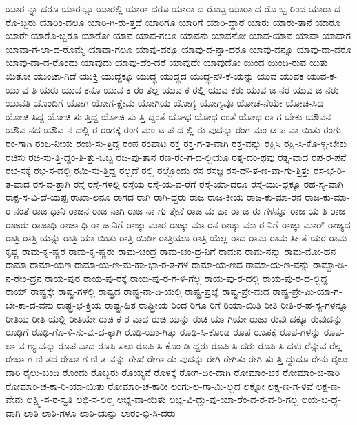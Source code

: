 {ಯಾರ-ನ್ನಾ-ದರೂ
ಯಾರನ್ನೂ
ಯಾರಲ್ಲಿ
ಯಾರಾ-ದರೂ
ಯಾರಾ-ದ-ರೊಬ್ಬ
ಯಾರಾ-ದ-ರೊ-ಬ್ಬ-ರಿಂದ
ಯಾರಾ-ದ-ರೊ-ಬ್ಬರು
ಯಾರಿಂ-ದಲೂ
ಯಾರಿ-ಗಿ-ರು-ತ್ತದೆ
ಯಾರಿಗೂ
ಯಾರಿಗೆ
ಯಾರಿ-ದ್ದಾರೆ
ಯಾರು
ಯಾರು-ತಾನೆ
ಯಾರೂ
ಯಾರೇ
ಯಾರೊ-ಬ್ಬರೂ
ಯಾರೋ
ಯಾವ
ಯಾವ-ಗಲೂ
ಯಾವನು
ಯಾವನೋ
ಯಾವ-ಯಾವ
ಯಾವಾ
ಯಾವಾಗ
ಯಾವಾ-ಗ-ಲಾ-ದ-ರೊಮ್ಮೆ
ಯಾವಾ-ಗಲೂ
ಯಾವು-ದಕ್ಕೂ
ಯಾವು-ದ-ನ್ನಾ-ದರೂ
ಯಾವು-ದನ್ನೂ
ಯಾವು-ದಾ-ದರೂ
ಯಾವು-ದಾ-ದ-ರೊಂದು
ಯಾವುದು
ಯಾವು-ದೆಂ-ದರೆ
ಯಾವುದೇ
ಯಾವುದೋ
ಯಿಂದ
ಯಿಂದಿ-ರುವ
ಯಿತು
ಯಿತೋ
ಯುಂಟಾ-ಗಿದೆ
ಯುಕ್ತಿ
ಯುದ್ದಕ್ಕೂ
ಯುದ್ಧ
ಯುದ್ಧದ
ಯುದ್ಧ-ನೌ-ಕೆ-ಯನ್ನು
ಯುವ
ಯುವಕ
ಯುವ-ಕ-ಯು-ವ-ತಿ-ಯರು
ಯುವ-ಕನೂ
ಯುವ-ಕ-ರಂ-ತಲ್ಲ
ಯುವ-ಕ-ರಲ್ಲಿ
ಯುವ-ಕರು
ಯುವ-ಜ-ನರ
ಯುವ-ಜ-ನರು
ಯುವತಿ
ಯೊಂದಿಗೆ
ಯೋಗ
ಯೋಗ-ಕ್ಷೇಮ
ಯೋಗಿಯ
ಯೋಗ್ಯ
ಯೋಗ್ಯವೂ
ಯೋಚ-ನೆಯೇ
ಯೋಚಿ-ಸಿದ
ಯೋಚಿ-ಸಿದ್ದ
ಯೋಚಿ-ಸು-ತ್ತಿದ್ದ
ಯೋಚಿ-ಸು-ತ್ತಿ-ದ್ದಂತೆ
ಯೋಧ
ಯೋಧ-ರಂತೆ
ಯೋಧ-ರಾ-ಗ-ಬೇಕು
ಯೌವನ
ಯೌವ-ನದ
ಯೌವ-ನ-ದಲ್ಲಿ
ರ
ರಂಗಕ್ಕೆ
ರಂಗ-ಮಂ-ಟ-ಪ-ದ-ಲ್ಲಿ-ರು-ವುದನ್ನು
ರಂಗ-ಮಂ-ಟ-ಪ-ವಾ-ಯಿತು
ರಂಗು-ರಂ-ಗಾಗಿ
ರಂಜ-ನೀಯ
ರಂಜಿ-ಸು-ತ್ತಿದ್ದ
ರಂಪ
ರಂಪಾಟ
ರಕ್ತ
ರಕ್ತ-ಗ-ತ-ವಾಗಿ
ರಕ್ತ-ವನ್ನು
ರಕ್ಷಿಸಿ
ರಕ್ಷಿ-ಸಿ-ಕೊ-ಳ್ಳ-ಬೇಕು
ರಚಿಸು
ರಚಿ-ಸು-ತ್ತಿ-ದ್ದಂ-ತಿ-ತ್ತು-ಒಬ್ಬ
ರಜ-ಪು-ತಾನ
ರಣ-ರಂ-ಗ-ದ-ಲ್ಲಿಯೂ
ರತ್ನ-ದಂ-ಥವು
ರತ್ನ-ವಾದ
ರಪ-ರ-ಪನೆ
ರಭ-ಸಕ್ಕೆ
ರಭ-ಸ-ದಲ್ಲಿ
ರಮಿ-ಸು-ತ್ತಿದ್ದ
ರಲ್ಲದೆ
ರಲ್ಲಿ
ರಲ್ಲೊಂದು
ರಸ
ರಸಜ್ಞ
ರಸ-ದೌ-ತ-ಣ-ವಾ-ಗು-ತ್ತಿತ್ತು
ರಸ-ಭ-ರಿ-ತ-ವಾದ
ರಸ-ವ-ತ್ತಾಗಿ
ರಸ್ತೆ
ರಸ್ತೆ-ಗಳಲ್ಲಿ
ರಸ್ತೆಯ
ರಸ್ತೆ-ಯ-ವ-ರೆಗೆ
ರಸ್ತೆ-ಯಾ-ದರೂ
ರಸ್ತೆ-ಯು-ದ್ದಕ್ಕೂ
ರಹ-ಸ್ಯ-ವಾಗಿ
ರಾಕ್ಷ-ಸ-ವಿ-ದೆ-ಯಪ್ಪ
ರಾಖಾ-ಲನೂ
ರಾಗದ
ರಾಗಿ
ರಾಗಿ-ದ್ದರು
ರಾಜ
ರಾಜ-ಕೀಯ
ರಾಜ-ಕು-ಮಾ-ರನ
ರಾಜ-ಕು-ಮಾ-ರ-ನಂತೆ
ರಾಜ-ಧಾನಿ
ರಾಜನ
ರಾಜ-ನಾಗಿ
ರಾಜ-ನಾ-ಗು-ತ್ತೇನೆ
ರಾಜ-ಮ-ಹಾ-ರಾ-ಜ-ರು-ಗಳನ್ನೂ
ರಾಜ-ಯ-ತಿ-ರಾಜ
ರಾಜರು
ರಾಜಾಧಿ
ರಾಜಾ-ಧಿ-ರಾ-ಜ-ನಿಗೆ
ರಾಜ್ಕು-ಮಾರ
ರಾಜ್ಕು-ಮಾ-ರನ
ರಾಜ್ಕು-ಮಾ-ರ-ನಿಗೆ
ರಾಜ್ಕು-ಮಾರ್
ರಾಜ್ಯದ
ರಾತ್ರಿ
ರಾತ್ರಿ-ಯನ್ನು
ರಾತ್ರಿ-ಯಾ-ಯಿತು
ರಾತ್ರಿ-ಯಿಡೀ
ರಾತ್ರಿಯೂ
ರಾತ್ರಿ-ಯೆಲ್ಲ
ರಾದ
ರಾಮ
ರಾಮ-ಸೀ-ತೆ-ಯರ
ರಾಮ-ಕೃಷ್ಣ
ರಾಮ-ಕೃ-ಷ್ಣರ
ರಾಮ-ಕೃ-ಷ್ಣರು
ರಾಮ-ಚಂದ್ರ
ರಾಮ-ಚಂ-ದ್ರ-ನಿಗೆ
ರಾಮನ
ರಾಮ-ನನ್ನು
ರಾಮ-ಮೋ-ಹನ
ರಾಮಾ
ರಾಮಾ-ಯಣ
ರಾಮಾ-ಯ-ಣ-ಮ-ಹಾ-ಭಾ-ರ-ತ-ಗಳ
ರಾಮಾ-ಯ-ಣದ
ರಾಮಾ-ಯ-ಣ-ವನ್ನು
ರಾಮ್ಖಾ-ಡಿ-ನ-ರೇಂ-ದ್ರನ
ರಾಯ-ಪುರ
ರಾಯ-ಪು-ರಕ್ಕೆ
ರಾಯ-ಪು-ರ-ಗ-ಳಿ-ಗೆಲ್ಲ
ರಾಯ-ಪು-ರ-ದಲ್ಲಿ
ರಾಯ-ಪು-ರ-ದ-ಲ್ಲಿದ್ದ
ರಾಯ್
ರಾಷ್ಟ್ರಕ್ಕೇ
ರಾಷ್ಟ್ರ-ಗಳಲ್ಲಿ
ರಾಷ್ಟ್ರದ
ರಾಷ್ಟ್ರ-ನಾ-ಡಿ-ಯಲ್ಲಿ
ರಾಷ್ಟ್ರ-ಪ್ರಜ್ಞೆ
ರಾಷ್ಟ್ರ-ಪ್ರೇ-ಮದ
ರಾಷ್ಟ್ರ-ಪ್ರೇ-ಮಿ-ಯಾ-ಗ-ಬೇ-ಕಾ-ದ-ವನು
ರಾಷ್ಟ್ರ-ಭ-ಕ್ತಿಯ
ರಾಷ್ಟ್ರ-ಹಿತ
ರಾಷ್ಟ್ರೀಯ
ರಿಂದ
ರಿಗೂ
ರಿಗೆ
ರಿಯಾ-ಯಿತಿ
ರೀತಿ
ರೀತಿ-ರ-ಹ-ಸ್ಯ-ಗಳನ್ನೂ
ರೀತಿಯ
ರೀತಿ-ಯಲ್ಲಿ
ರೀತಿಯೇ
ರುಚಿ-ಕ-ರ-ವಾದ
ರುಚಿ-ಯನ್ನು
ರುಚಿ-ಯಾ-ಗಿಯೇ
ರುಜು
ರುವು-ದಕ್ಕೂ
ರುವುದನ್ನು
ರೂಢಿಗೆ
ರೂಢಿ-ಗೊ-ಳಿ-ಸು-ವು-ದ-ಕ್ಕಾಗಿ
ರೂಢಿ-ಯಾ-ಗಿತ್ತು
ರೂಢಿ-ಸಿ-ಕೊಂಡ
ರೂಪ
ರೂಪಕ್ಕೆ
ರೂಪ-ಗಳನ್ನು
ರೂಪ-ಲಾ-ವ-ಣ್ಯ-ವನ್ನು
ರೂಪ-ವಾದ
ರೂಪಿ-ಸಲು
ರೂಪಿ-ಸಿ-ಕೊಂ-ಡಿ-ದ್ದರು
ರೂಪಿ-ಸಿ-ದರು
ರೂಪಿ-ಸಿ-ದಳು
ರೆನ್ನುವ
ರೆಲ್ಲ
ರೇಖಾ-ಗ-ಣಿ-ತದ
ರೇಖಾ-ಗ-ಣಿ-ತ-ವನ್ನು
ರೇಖೆ
ರೇಗಾ-ಡು-ವುದನ್ನು
ರೇಗಿ
ರೇಗಿತು
ರೇಗಿ-ಸು-ತ್ತಿ-ದ್ದುದೂ
ರೇನು
ರೈಲು-ದಾರಿ
ರೈಲು-ಬಂಡಿ
ರೊಂದು
ರೊಬ್ಬರು
ರೊಯ್ಯನೆ
ರೊಳಕ್ಕೆ
ರೋಗ-ದಿಂ-ದಾಗಿ
ರೋಮಾಂ-ಚಕ
ರೋಮಾಂ-ಚ-ಕಾರಿ
ರೋಮಾಂ-ಚ-ಕಾ-ರಿ-ಯಾ-ಯಿತು
ರೋಮಾಂ-ಚ-ಕಾರೀ
ಲಂಗು-ಲ-ಗಾ-ಮಿ-ಲ್ಲದ
ಲಕ್ನೋ
ಲಕ್ಷ-ಣ-ಗ-ಳಿವೆ
ಲಕ್ಷ-ಣ-ವೇನು
ಲಕ್ಷ್ಮಿ-ಸ-ರ-ಸ್ವತಿ
ಲಭಿ-ಸ-ಲಿಲ್ಲ
ಲಭ್ಯ-ವಾ-ಯಿತು
ಲಭ್ಯ-ವಿ-ದ್ದು-ವು-ಯಾ-ರೆಂ-ದ-ರ-ವ-ರಿ-ಗಲ್ಲ
ಲಯ-ಬ-ದ್ಧ-ವಾಗಿ
ಲಾಠಿ
ಲಾಠಿ-ಗಳೂ
ಲಾಠಿ-ಯನ್ನು
ಲಾರಂ-ಭಿ-ಸಿ-ದರು
}

